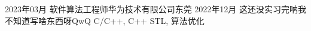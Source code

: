 %
%

 
\begin{experiences}
  \experience
  {2023年03月} {软件算法工程师}{华为技术有限公司}{东莞}
  {2022年12月} {
    这还没实习完呐我不知道写啥东西呀QwQ
                }
                {C/C++, C++ STL, 算法优化}



\end{experiences}
